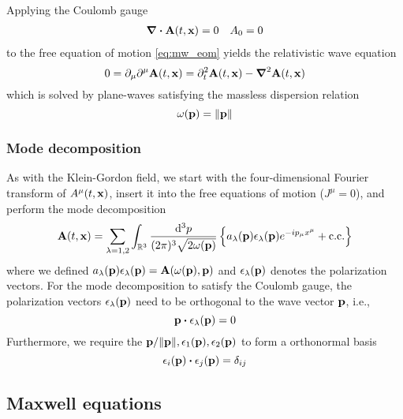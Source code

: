 Applying the Coulomb gauge
\begin{align}
	\div\vb{A}(t,\vb{x})
	=
	0
	&&
	A_0
	=
	0
	\label{eq:mw_coulomb_gauge}
\end{align}
to the free equation of motion \cref{eq:mw_eom} yields the relativistic wave equation
\begin{equation}
	0
	=
	\partial_\mu\partial^\mu
	\vb{A}(t,\vb{x})
	=
	\partial_t^2
	\vb{A}(t,\vb{x})
	-
	\grad^2
	\vb{A}(t,\vb{x})
	\label{eq:mw_relatistic_wave}
\end{equation}
which is solved by plane-waves satisfying the massless dispersion relation
\begin{equation}
	\omega(\vb{p})
	=
	\norm{\vb{p}}
\end{equation}

\subsubsection{Mode decomposition}

As with the Klein-Gordon field, we start with the four-dimensional Fourier transform of $A^\mu(t,\vb{x})$, insert it into the free equations of motion ($J^\mu=0$), and perform the mode decomposition
\begin{equation}
	\vb{A}(t,\vb{x})
	=
	\sum_{\lambda=1,2}
	\int_{\mathbb{R}^3}\frac{\dd[3]{p}}{(2\pi)^3\sqrt{2\omega(\vb{p})}}
	\left\{
		a_\lambda(\vb{p})
		\vb{\epsilon}_\lambda(\vb{p})
		e^{-ip_\mu x^\mu}
		+
		\text{c.c.}
	\right\}
	\label{eq:mw_ft}
\end{equation}
where we defined $a_\lambda(\vb{p})\vb{\epsilon}_\lambda(\vb{p})=\vb{A}(\omega(\vb{p}),\vb{p})$ and $\vb{\epsilon}_\lambda(\vb{p})$ denotes the polarization vectors.
For the mode decomposition to satisfy the Coulomb gauge, the polarization vectors $\vb{\epsilon}_\lambda(\vb{p})$ need to be orthogonal to the wave vector $\vb{p}$, i.e.,
\begin{equation}
	\vb{p}\vdot\vb{\epsilon}_\lambda(\vb{p})
	=
	0	
\end{equation}
Furthermore, we require the $\vb{p}/\norm{\vb{p}},\vb{\epsilon}_1(\vb{p}),\vb{\epsilon}_2(\vb{p})$ to form a orthonormal basis
\begin{equation}
	\vb{\epsilon}_i(\vb{p})
	\vdot
	\vb{\epsilon}_j(\vb{p})
	=
	\delta_{ij}
\end{equation}

\subsection{Maxwell equations}


